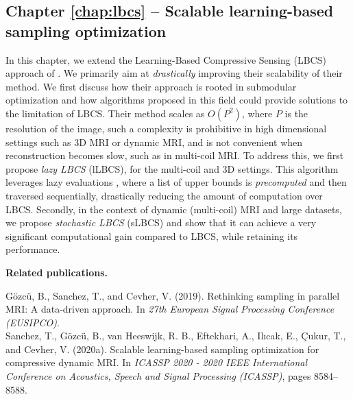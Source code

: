 \subsection*{Chapter \ref{chap:lbcs} -- Scalable learning-based sampling optimization}
In this chapter, we extend the Learning-Based Compressive Sensing (LBCS) approach of \citet{gozcu2018learning}. We primarily aim at \textit{drastically} improving their scalability of their method. We first discuss how their approach is rooted in submodular optimization \citep{krause2014submodular} and how algorithms proposed in this field could provide solutions to the limitation of LBCS. Their method scales as $O(P^2)$, where $P$ is the resolution of the image, such a complexity is prohibitive in high dimensional settings such as 3D MRI or dynamic MRI, and is not convenient when reconstruction becomes slow, such as in multi-coil MRI. To address this, we first propose \textit{lazy LBCS} (lLBCS), for the multi-coil and 3D settings. This algorithm leverages lazy evaluations \citep{minoux1978accelerated}, where a list of upper bounds is \textit{precomputed} and then traversed sequentially, drastically reducing the amount of computation over LBCS. Secondly, in the context of dynamic (multi-coil) MRI and large datasets, we propose\textit{ stochastic LBCS} (sLBCS) and show that it can achieve a very significant computational gain compared to LBCS, while retaining its performance.

\textbf{Related publications.} 
\begin{adjustwidth}{.5cm}{}
G{\"o}zc{\"u}, B., Sanchez, T., and Cevher, V. (2019). Rethinking sampling in parallel MRI: A data-driven approach. In \textit{27th European Signal Processing Conference (EUSIPCO)}.\\[0.4cm]
Sanchez, T., G{\"o}zc{\"u}, B., van Heeswijk, R. B., Eftekhari, A., Il{\i}cak, E., \c{C}ukur, T., and Cevher, V. (2020a). Scalable learning-based sampling optimization for compressive dynamic MRI. In \textit{ICASSP 2020 - 2020 IEEE International Conference on Acoustics, Speech and Signal Processing (ICASSP)}, pages 8584–8588.
\end{adjustwidth}


